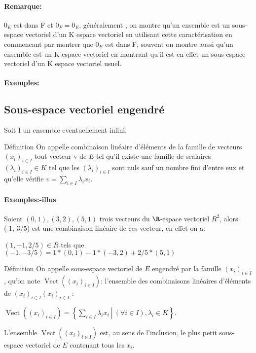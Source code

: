 \documentclass{book}
\begin{document}
\paragraph{Remarque:}
\(0_E\) est dans F et \(0_F=0_E\), généralement , on montre qu'un ensemble est un sous-espace vectoriel d'un K espace vectoriel en utilisant cette caractérisation en commencant par montrer que \(0_E\) est dans F, souvent on montre aussi qu'un ensemble est un K espace vectoriel en montrant qu'il est en effet un sous-espace vectoriel d'un K espace vectoriel usuel.
\paragraph{Exemples: }
\subsection{Sous-espace vectoriel engendré}

 
Soit I un ensemble eventuellement infini.
\begin{Définition}[]{Définition}{}
On appelle combinaison linéaire d'éléments de la famille de vecteurs ${\displaystyle (x_{i})_{i\in I}}$ tout vecteur v de ${\displaystyle E}$ tel qu’il existe une famille de scalaires ${\displaystyle (\lambda _{i})_{i\in I}\in K}  $
tel que les ${\displaystyle (\lambda _{i})_{i\in I}}$ sont nuls sauf un nombre fini d'entre eux et qu'elle vérifie ${\displaystyle v=\sum _{i\in I}\lambda _{i}x_{i}}.$
\end{Définition}
\paragraph{Exemples:-illus }
Soient \((0,1), (3,2), (5,1)\) trois vecteurs du \(\R\)-espace vectoriel \(R^2\), alors (-1,-3/5) est une combinaison linéaire de ces vecteur, en effet on a: 

\((1,-1,2/5) \in R\) tels que \((-1,-3/5) = 1*(0,1)-1*(-3,2) + 2/5*(5,1)\) 
\begin{Définition}[]{Définition}{}
On appelle sous-espace vectoriel de ${\displaystyle E}$ engendré par la famille ${\displaystyle (x_{i})_{i\in I}}$, qu'on note ${\displaystyle \operatorname {Vect} \left((x_{i})_{i\in I}\right)}$: l’ensemble des combinaisons linéaires d'éléments de 
${\displaystyle (x_{i})_{i\in I}}{\displaystyle (x_{i})_{i\in I}}$ :
\begin{framed}
${\displaystyle \operatorname {Vect} \left((x_{i})_{i\in I}\right)=\left\{\left.\sum _{i\in I}\lambda _{i}x_{i}~\right|~(\forall i \in I), \lambda _{i}\in K\right\}}$.
\end{framed}
L'ensemble ${\displaystyle \operatorname{Vect} \left((x_{i})_{i\in I}\right)}$ est, au sens de l'inclusion, le plus petit sous-espace vectoriel de ${\displaystyle E}$ contenant tous les ${\displaystyle x_{i}}.$
\end{Définition}
\end{document}
